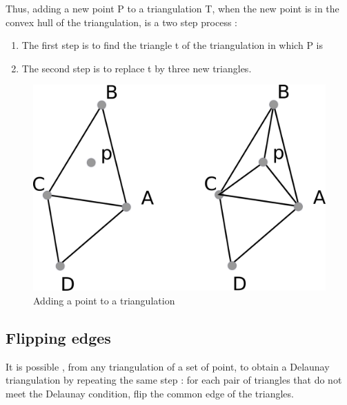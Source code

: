 \documentclass[a4paper,10pt]{article}
\begin{document}
Thus, adding a new point P to a triangulation T, when the new point is in the convex hull of the triangulation, is a two step process :
\begin{enumerate}
\item The first step is to find the triangle t of the triangulation in which P is 
\item The second step is to replace t by three new triangles.
\end{enumerate}
\begin{figure}[h]
\centering
\caption{Adding a point to a triangulation}
\includegraphics[scale=1]{adding} 
\end{figure}
\subsection{Flipping edges}

It is possible , from any triangulation of a set of point, to obtain a Delaunay triangulation by repeating the same step : for each pair of triangles that do not meet the Delaunay condition, flip the common edge of the triangles.
\end{document}
